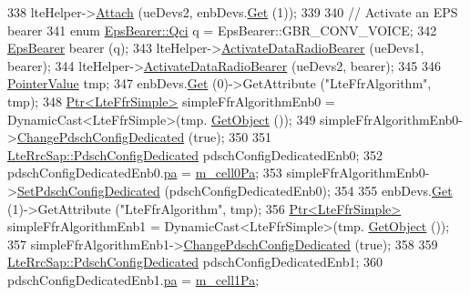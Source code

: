 \begin{DoxyCode}
338   lteHelper->\hyperlink{classns3_1_1LteHelper_a9466743f826aa2652a87907b7f0a1c87}{Attach} (ueDevs2, enbDevs.\hyperlink{classns3_1_1NetDeviceContainer_a677d62594b5c9d2dea155cc5045f4d0b}{Get} (1));
339 
340   \textcolor{comment}{// Activate an EPS bearer}
341   \textcolor{keyword}{enum} \hyperlink{structns3_1_1EpsBearer_aecf0c67109c5eb4ec0b07226fff5885e}{EpsBearer::Qci} q = EpsBearer::GBR\_CONV\_VOICE;
342   \hyperlink{structns3_1_1EpsBearer}{EpsBearer} bearer (q);
343   lteHelper->\hyperlink{classns3_1_1LteHelper_ac896e16cf162e4beeaa292d39ab1b700}{ActivateDataRadioBearer} (ueDevs1, bearer);
344   lteHelper->\hyperlink{classns3_1_1LteHelper_ac896e16cf162e4beeaa292d39ab1b700}{ActivateDataRadioBearer} (ueDevs2, bearer);
345 
346   \hyperlink{classns3_1_1PointerValue}{PointerValue} tmp;
347   enbDevs.\hyperlink{classns3_1_1NetDeviceContainer_a677d62594b5c9d2dea155cc5045f4d0b}{Get} (0)->GetAttribute (\textcolor{stringliteral}{"LteFfrAlgorithm"}, tmp);
348   \hyperlink{classns3_1_1Ptr}{Ptr<LteFfrSimple>} simpleFfrAlgorithmEnb0 = DynamicCast<LteFfrSimple>(tmp.
      \hyperlink{classns3_1_1PointerValue_a53d0f9f5c538ea6120c96a1ecb1344a8}{GetObject} ());
349   simpleFfrAlgorithmEnb0->\hyperlink{classns3_1_1LteFfrSimple_a23f83819e8f2262243592a111f8668fe}{ChangePdschConfigDedicated} (\textcolor{keyword}{true});
350 
351   \hyperlink{structns3_1_1LteRrcSap_1_1PdschConfigDedicated}{LteRrcSap::PdschConfigDedicated} pdschConfigDedicatedEnb0;
352   pdschConfigDedicatedEnb0.\hyperlink{structns3_1_1LteRrcSap_1_1PdschConfigDedicated_aa9b1574a63fb83c53649305ca95aeb31}{pa} = \hyperlink{classLteCqiGenerationDlPowerControlTestCase_a3e589a276efa33f73261038924d1b919}{m\_cell0Pa};
353   simpleFfrAlgorithmEnb0->\hyperlink{classns3_1_1LteFfrSimple_a3da8348dd3cc4173464933912ae7524b}{SetPdschConfigDedicated} (pdschConfigDedicatedEnb0);
354 
355   enbDevs.\hyperlink{classns3_1_1NetDeviceContainer_a677d62594b5c9d2dea155cc5045f4d0b}{Get} (1)->GetAttribute (\textcolor{stringliteral}{"LteFfrAlgorithm"}, tmp);
356   \hyperlink{classns3_1_1Ptr}{Ptr<LteFfrSimple>} simpleFfrAlgorithmEnb1 = DynamicCast<LteFfrSimple>(tmp.
      \hyperlink{classns3_1_1PointerValue_a53d0f9f5c538ea6120c96a1ecb1344a8}{GetObject} ());
357   simpleFfrAlgorithmEnb1->\hyperlink{classns3_1_1LteFfrSimple_a23f83819e8f2262243592a111f8668fe}{ChangePdschConfigDedicated} (\textcolor{keyword}{true});
358 
359   \hyperlink{structns3_1_1LteRrcSap_1_1PdschConfigDedicated}{LteRrcSap::PdschConfigDedicated} pdschConfigDedicatedEnb1;
360   pdschConfigDedicatedEnb1.\hyperlink{structns3_1_1LteRrcSap_1_1PdschConfigDedicated_aa9b1574a63fb83c53649305ca95aeb31}{pa} = \hyperlink{classLteCqiGenerationDlPowerControlTestCase_ad41f36391682d8a235fa343fc4fd98a8}{m\_cell1Pa};

\end{DoxyCode}
